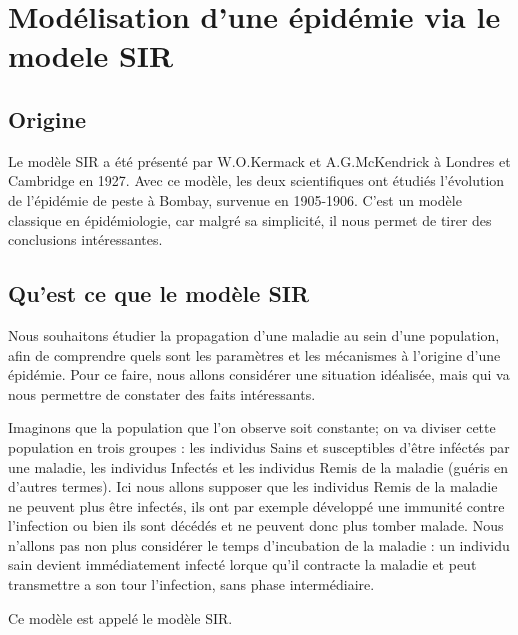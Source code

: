\documentclass[a4paper]{article}
\theoremstyle{plain}
\theoremstyle{definition}
\theoremstyle{remark}
\begin{document}
\section{Modélisation d'une épidémie via le modele SIR}
\subsection{Origine}
Le modèle SIR a été présenté par W.O.Kermack et A.G.McKendrick à Londres et Cambridge en 1927. Avec ce modèle, les deux scientifiques ont étudiés l’évolution de l’épidémie de peste à Bombay, survenue en 1905-1906.
C'est un modèle classique en épidémiologie, car malgré sa simplicité, il nous permet de tirer des conclusions intéressantes.

\subsection{Qu'est ce que le modèle SIR}


Nous souhaitons étudier la propagation d'une maladie au sein d'une population, afin de comprendre quels sont les paramètres et les mécanismes à l'origine d'une épidémie. Pour ce faire, nous allons considérer une situation idéalisée, mais qui va nous permettre de constater des faits intéressants.

Imaginons que la population que l'on observe soit constante; on va diviser cette population en trois groupes : les individus Sains et susceptibles d'être inféctés par une maladie, les individus Infectés et les individus Remis de la maladie (guéris en d'autres termes). Ici nous allons supposer que les individus Remis de la maladie ne peuvent plus être infectés, ils ont par exemple développé une immunité contre l'infection ou bien ils sont décédés et ne peuvent donc plus tomber malade. Nous n'allons pas non plus considérer le temps d'incubation de la maladie : un individu sain devient immédiatement infecté lorque qu'il contracte la maladie et peut transmettre a son tour l'infection, sans phase intermédiaire. 

Ce modèle est appelé le modèle SIR.
\end{document}
